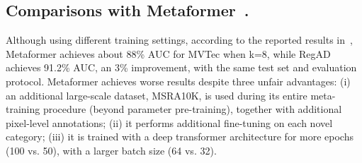 \documentclass[runningheads]{llncs}
\begin{document}
\subsection{Comparisons with Metaformer~\cite{metaformer}.}
Although using different training settings, according to the reported results in~\cite{metaformer}, Metaformer achieves about 88\% AUC for MVTec when k=8, while RegAD achieves 91.2\% AUC, an 3\% improvement, with the same test set and evaluation protocol. Metaformer achieves worse results despite three unfair advantages: (i) an additional large-scale dataset, MSRA10K, is used during its entire meta-training procedure (beyond parameter pre-training), together with additional pixel-level annotations; (ii) it performs additional fine-tuning on each novel category; (iii) it is trained with a deep transformer architecture for more epochs (100 vs. 50), with a larger batch size (64 vs. 32).
\end{document}
